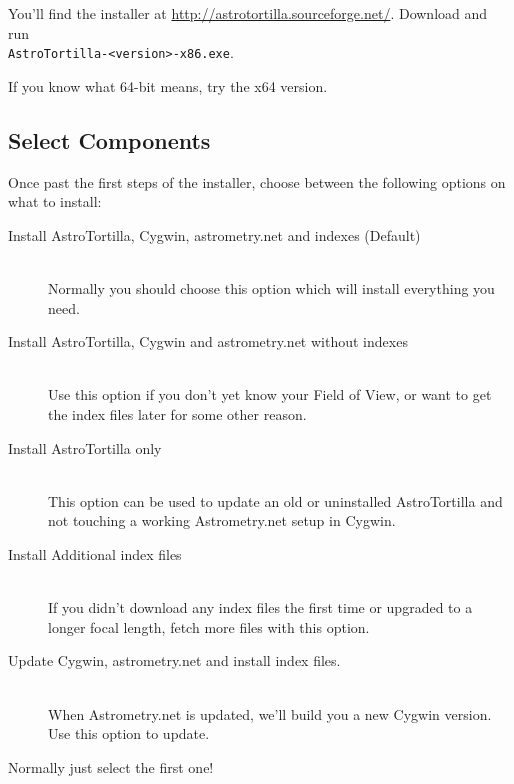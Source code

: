 \documentclass[english]{article}
\newcommand{\surl}[1]{{\small \url{#1}}}
\begin{document}
You'll find the installer at \surl{http://astrotortilla.sourceforge.net/}.
Download and run \\\texttt{AstroTortilla-<version>-x86.exe}. 

If you know what 64-bit means, try the x64 version.

\subsection{Select Components}

Once past the first steps of the installer, choose between the following options on what to install:
\begin{description}
\item [Install AstroTortilla, Cygwin, astrometry.net and indexes (Default)] \hfill \\
Normally you should choose this option which will install everything you need. 

\item [Install AstroTortilla, Cygwin and astrometry.net without indexes]\hfill \\
Use this option if you don't yet know your Field of View, or want to get the index files later for some other reason.

\item [Install AstroTortilla only] \hfill \\
This option can be used to update an old or uninstalled AstroTortilla and not touching a working Astrometry.net setup in Cygwin.

\item [Install Additional index files] \hfill \\
If you didn't download any index files the first time or upgraded to a longer focal length, fetch more files with this option.

\item [Update Cygwin, astrometry.net and install index files.] \hfill \\
When Astrometry.net is updated, we'll build you a new Cygwin version. Use this option to update.

\end{description}

Normally just select the first one!
\end{document}
